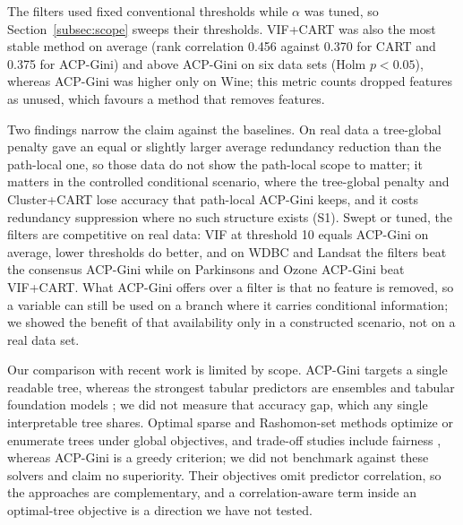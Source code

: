 \documentclass[pdflatex,sn-basic,Numbered]{sn-jnl}
\begin{document}
The filters used fixed conventional thresholds while $\alpha$ was tuned, so Section~\ref{subsec:scope} sweeps their thresholds. VIF+CART was also the most stable method on average (rank correlation 0.456 against 0.370 for CART and 0.375 for ACP-Gini) and above ACP-Gini on six data sets (Holm $p<0.05$), whereas ACP-Gini was higher only on Wine; this metric counts dropped features as unused, which favours a method that removes features.

\begin{table}[!htbp]\centering\caption{Bootstrap importance-weighted redundancy $R_w$ by method (lower is better). Bold marks ACP-Gini where it has the lowest value.}\label{tab:redundancy}\scriptsize\setlength{\tabcolsep}{3pt}\end{table}
\begin{table}[!tbp]\centering\caption{ACP-Gini minus each baseline in bootstrap $R_w$, with 95\% corrected-resampled intervals and Holm-adjusted $p$ in parentheses (negative favours ACP-Gini). Bold marks a significantly lower $R_w$ for ACP-Gini.}\label{tab:vsfilters}\tiny\setlength{\tabcolsep}{2pt}\end{table}


Two findings narrow the claim against the baselines. On real data a tree-global penalty gave an equal or slightly larger average redundancy reduction than the path-local one, so those data do not show the path-local scope to matter; it matters in the controlled conditional scenario, where the tree-global penalty and Cluster+CART lose accuracy that path-local ACP-Gini keeps, and it costs redundancy suppression where no such structure exists (S1). Swept or tuned, the filters are competitive on real data: VIF at threshold 10 equals ACP-Gini on average, lower thresholds do better, and on WDBC and Landsat the filters beat the consensus ACP-Gini while on Parkinsons and Ozone ACP-Gini beat VIF+CART. What ACP-Gini offers over a filter is that no feature is removed, so a variable can still be used on a branch where it carries conditional information; we showed the benefit of that availability only in a constructed scenario, not on a real data set.

Our comparison with recent work is limited by scope. ACP-Gini targets a single readable tree, whereas the strongest tabular predictors are ensembles and tabular foundation models \cite{hollmann2025tabpfn,erickson2025tabarena}; we did not measure that accuracy gap, which any single interpretable tree shares. Optimal sparse and Rashomon-set methods \cite{zhang2023osrt,babbar2025split,arslan2025sorted,hsu2025rashomon} optimize or enumerate trees under global objectives, and trade-off studies include fairness \cite{jo2023fair}, whereas ACP-Gini is a greedy criterion; we did not benchmark against these solvers and claim no superiority. Their objectives omit predictor correlation, so the approaches are complementary, and a correlation-aware term inside an optimal-tree objective is a direction we have not tested.
\end{document}
